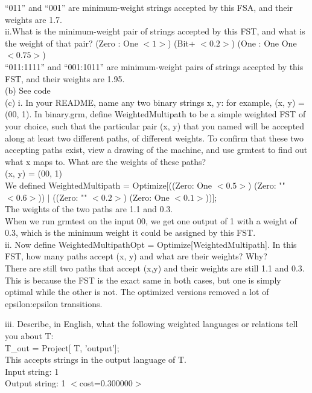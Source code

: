 \documentclass[11pt]{article} %
\begin{document}
``011” and ``001” are minimum-weight strings accepted by this FSA, and their weights are 1.7.\\

ii.What is the minimum-weight pair of strings accepted by this FST, and what is the weight of that pair? (Zero : One $<1>$) (Bit+ $<0.2>$) (One : One One $<0.75>$)\\

``011:1111” and ``001:1011” are minimum-weight pairs of strings accepted by this FST, and their weights are 1.95.\\

(b) See code\\

(c) i. In your README, name any two binary strings x, y: for example, (x, y) = (00, 1). In binary.grm, define WeightedMultipath to be a simple weighted FST of your choice, such that the particular pair (x, y) that you named will be accepted along at least two different paths, of different weights. To confirm that these two accepting paths exist, view a drawing of the machine, and use grmtest to find out what x maps to. What are the weights of these paths?\\

(x, y) = (00, 1)\\

We defined WeightedMultipath = Optimize[((Zero: One $<0.5>$) (Zero: "" $<0.6>$)) $|$ ((Zero: "" $<0.2>$) (Zero: One $<0.1>$))];\\

The weights of the two paths are 1.1 and 0.3.\\

When we run grmtest on the input 00, we get one output of 1 with a weight of 0.3, which is the minimum weight it could be assigned by this FST.\\

ii. Now define WeightedMultipathOpt = Optimize[WeightedMultipath]. In this FST, how many paths accept (x, y) and what are their weights? Why?\\

There are still two paths that accept (x,y) and their weights are still 1.1 and 0.3. This is because the FST is the exact same in both cases, but one is simply optimal while the other is not. The optimized versions removed a lot of epsilon:epsilon transitions.\\

\newpage

iii. Describe, in English, what the following weighted languages or relations tell you about T:\\
T\_out = Project[ T, ’output’];\\
This accepts strings in the output language of T.\\
Input string: 1\\
Output string: 1 $<$cost=0.300000$>$\\
\end{document}

